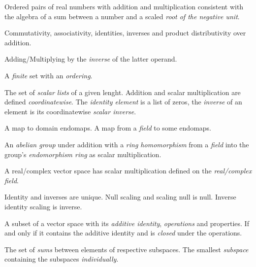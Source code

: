 

\usepackage[english]{babel}



\begin{multicols}{3}

  Ordered pairs of real numbers with addition and multiplication consistent with
  the algebra of a sum between a number and a scaled \textit{root of the negative unit}.

  Commutativity, associativity, identities, inverses and product distributivity over addition.

  Adding/Multiplying by the \textit{inverse} of the latter operand.

  A \textit{finite} set with an \textit{ordering}.

  The set of \textit{scalar lists} of a given lenght.
  Addition and scalar multiplication are defined \textit{coordinatewise}.
  The \textit{identity element} is a list of zeros, the \textit{inverse}
  of an element is its coordinatewise \textit{scalar inverse}.

  A map to domain endomaps.
  A map from a \textit{field} to some endomaps.

  An \textit{abelian group} under addition with a \textit{ring homomorphism} from a \textit{field} into the group's \textit{endomorphism ring} as scalar multiplication.

  A real/complex vector space has scalar multiplication defined on the \textit{real/complex field}.

  Identity and inverses are unique. Null scaling and scaling null is null. Inverse identity scaling is inverse.

  A subset of a vector space with its \textit{additive identity}, \textit{operations} and properties.
  If and only if it contains the additive identity and is \textit{closed} under the operations.

  The set of \textit{sums} between elements of respective subspaces.
  The smallest \textit{subspace} containing the subspaces \textit{individually}.


\end{multicols}
